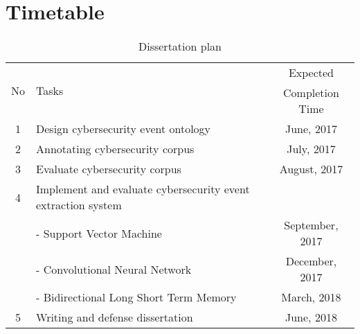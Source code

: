 \chapter{Timetable}
\thispagestyle{plain}

\label{Chapter6}

\begin{table}[h]

\begin{tabular}{ |c|l|c| } 
 \hline
\multirow{2}{1em}{No} & \multirow{2}{2em}{Tasks} & Expected  \\
 & & Completion Time \\
\hline
1 & Design cybersecurity event ontology & June, 2017 \\
2 & Annotating cybersecurity corpus & July, 2017 \\
3 & Evaluate cybersecurity corpus & August, 2017 \\
4 & Implement and evaluate cybersecurity event extraction system & \\
 & - Support Vector Machine & September, 2017 \\
 & - Convolutional Neural Network & December, 2017 \\
 & - Bidirectional Long Short Term Memory & March, 2018 \\ 
5 & Writing and defense dissertation & June, 2018 \\
 \hline
\end{tabular}
\caption{Dissertation plan}
\label{table:61}

\end{table}

